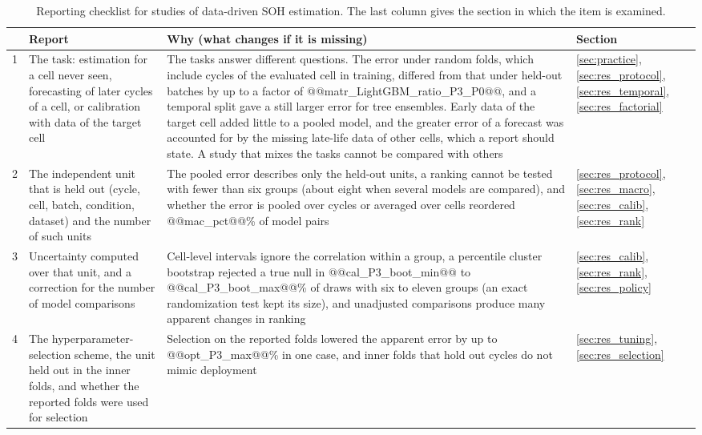 \documentclass{ieeeaccess}
\begin{document}
\begin{table}[!t]
\caption{Reporting checklist for studies of data-driven SOH estimation. The last column gives the section in which the item is examined.}
\label{tab:checklist}
\centering
\footnotesize
\begin{tabular}{p{}p{}p{}p{}}
\toprule
 & Report & Why (what changes if it is missing) & Section \\
\midrule
1 & The task: estimation for a cell never seen, forecasting of later cycles of a cell, or calibration with data of the target cell & The tasks answer different questions. The error under random folds, which include cycles of the evaluated cell in training, differed from that under held-out batches by up to a factor of @@matr_LightGBM_ratio_P3_P0@@, and a temporal split gave a still larger error for tree ensembles. Early data of the target cell added little to a pooled model, and the greater error of a forecast was accounted for by the missing late-life data of other cells, which a report should state. A study that mixes the tasks cannot be compared with others & \ref{sec:practice}, \ref{sec:res_protocol}, \ref{sec:res_temporal}, \ref{sec:res_factorial} \\
2 & The independent unit that is held out (cycle, cell, batch, condition, dataset) and the number of such units & The pooled error describes only the held-out units, a ranking cannot be tested with fewer than six groups (about eight when several models are compared), and whether the error is pooled over cycles or averaged over cells reordered @@mac_pct@@\% of model pairs & \ref{sec:res_protocol}, \ref{sec:res_macro}, \ref{sec:res_calib}, \ref{sec:res_rank} \\
3 & Uncertainty computed over that unit, and a correction for the number of model comparisons & Cell-level intervals ignore the correlation within a group, a percentile cluster bootstrap rejected a true null in @@cal_P3_boot_min@@ to @@cal_P3_boot_max@@\% of draws with six to eleven groups (an exact randomization test kept its size), and unadjusted comparisons produce many apparent changes in ranking & \ref{sec:res_calib}, \ref{sec:res_rank}, \ref{sec:res_policy} \\
4 & The hyperparameter-selection scheme, the unit held out in the inner folds, and whether the reported folds were used for selection & Selection on the reported folds lowered the apparent error by up to @@opt_P3_max@@\% in one case, and inner folds that hold out cycles do not mimic deployment & \ref{sec:res_tuning}, \ref{sec:res_selection} \\

\end{tabular}
\end{table}
\end{document}
